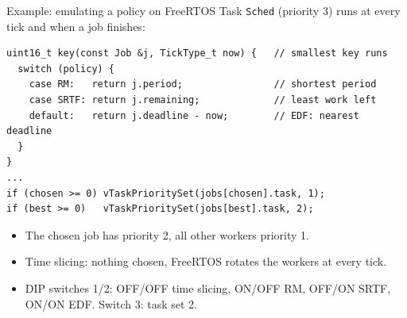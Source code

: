 \begin{frame}[fragile]{Example: emulating a policy on FreeRTOS}
  Task \texttt{Sched} (priority 3) runs at every tick and when a job finishes:
\begin{lstlisting}[basicstyle=\ttfamily\scriptsize]
uint16_t key(const Job &j, TickType_t now) {   // smallest key runs
  switch (policy) {
    case RM:   return j.period;                // shortest period
    case SRTF: return j.remaining;             // least work left
    default:   return j.deadline - now;        // EDF: nearest deadline
  }
}
...
if (chosen >= 0) vTaskPrioritySet(jobs[chosen].task, 1);
if (best >= 0)   vTaskPrioritySet(jobs[best].task, 2);
\end{lstlisting}
  \begin{itemize}
    \item The chosen job has priority 2, all other workers priority 1.
    \item Time slicing: nothing chosen, FreeRTOS rotates the workers at every tick.
    \item DIP switches 1/2: OFF/OFF time slicing, ON/OFF RM, OFF/ON SRTF, ON/ON EDF. Switch 3: task set 2.
  \end{itemize}
\end{frame}

